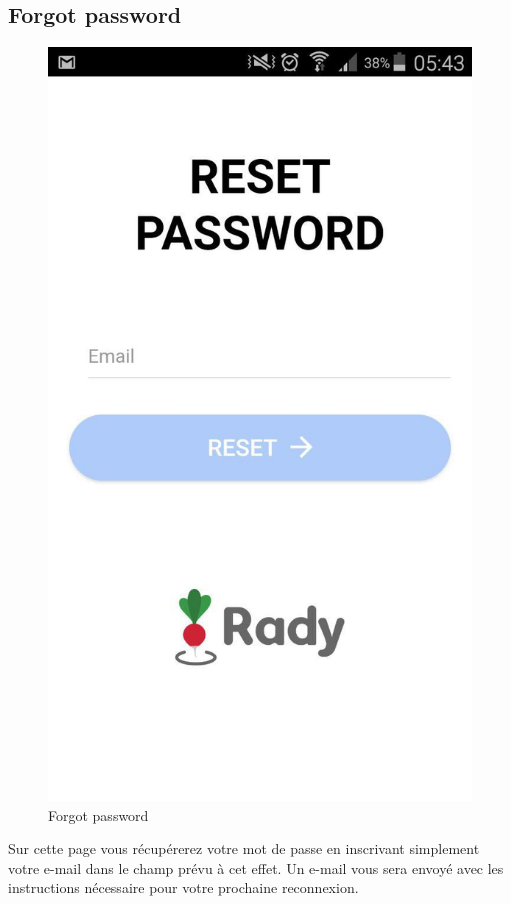 \documentclass[french]{article}
\begin{document}
	\subsection{Forgot password}
	\begin{figure}[H]
		\centering
		\includegraphics[scale=0.4]{../screenshot/screenshot-reset-password}
		\caption{Forgot password}
		\label{Forgot password}
	\end{figure} 
	
	Sur cette page vous récupérerez votre mot de passe en inscrivant simplement votre e-mail dans le champ prévu à cet effet. Un e-mail vous sera envoyé avec les instructions nécessaire pour votre prochaine reconnexion.
	
\end{document}
